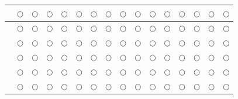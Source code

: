 \documentclass{article}
\begin{document}
\begin{center}
\begin{longtable}{ |p{6cm}|c|c|c|c|c|c|c|c|c|c|c|c|c|c|c|}
&$\bigcirc$&$\bigcirc$
&$\bigcirc$&$\bigcirc$&$\bigcirc$&$\bigcirc$&$\bigcirc$&$\bigcirc$&$\bigcirc$&$\bigcirc$&$\bigcirc$&$\bigcirc$&$\bigcirc$&$\bigcirc$&$\bigcirc$\\
\hline

&$\bigcirc$&$\bigcirc$
&$\bigcirc$&$\bigcirc$&$\bigcirc$&$\bigcirc$&$\bigcirc$&$\bigcirc$&$\bigcirc$&$\bigcirc$&$\bigcirc$&$\bigcirc$&$\bigcirc$&$\bigcirc$&$\bigcirc$\\
\hline

&$\bigcirc$&$\bigcirc$
&$\bigcirc$&$\bigcirc$&$\bigcirc$&$\bigcirc$&$\bigcirc$&$\bigcirc$&$\bigcirc$&$\bigcirc$&$\bigcirc$&$\bigcirc$&$\bigcirc$&$\bigcirc$&$\bigcirc$\\
\hline

&$\bigcirc$&$\bigcirc$
&$\bigcirc$&$\bigcirc$&$\bigcirc$&$\bigcirc$&$\bigcirc$&$\bigcirc$&$\bigcirc$&$\bigcirc$&$\bigcirc$&$\bigcirc$&$\bigcirc$&$\bigcirc$&$\bigcirc$\\
\hline

&$\bigcirc$&$\bigcirc$
&$\bigcirc$&$\bigcirc$&$\bigcirc$&$\bigcirc$&$\bigcirc$&$\bigcirc$&$\bigcirc$&$\bigcirc$&$\bigcirc$&$\bigcirc$&$\bigcirc$&$\bigcirc$&$\bigcirc$\\
\hline

&$\bigcirc$&$\bigcirc$
&$\bigcirc$&$\bigcirc$&$\bigcirc$&$\bigcirc$&$\bigcirc$&$\bigcirc$&$\bigcirc$&$\bigcirc$&$\bigcirc$&$\bigcirc$&$\bigcirc$&$\bigcirc$&$\bigcirc$\\
\hline


\end{longtable}
\end{center}
\end{document}
